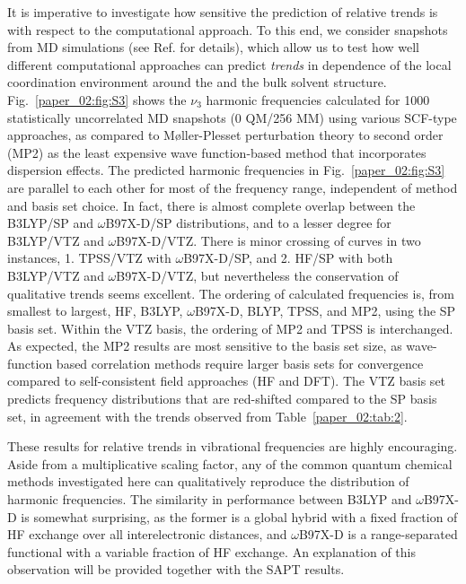 It is imperative to investigate how sensitive the prediction of relative trends is with respect to the computational approach. To this end, we consider snapshots from MD simulations (see Ref. \citep{Daly2016} for details), which allow us to test how well different computational approaches can predict \emph{trends} in dependence of the local coordination environment around the  and the bulk solvent structure. Fig.~\ref{paper_02:fig:S3} shows the  \(\nu_{3}\) harmonic frequencies calculated for \num{1000} statistically uncorrelated MD snapshots (0 QM/256 MM) using various SCF-type approaches, as compared to Møller-Plesset perturbation theory to second order (MP2) as the least expensive wave function-based method that incorporates dispersion effects.\cite{WCMS:WCMS58} The predicted harmonic frequencies in Fig.~\ref{paper_02:fig:S3} are parallel to each other for most of the frequency range, independent of method and basis set choice. In fact, there is almost complete overlap between the B3LYP/SP and \(\omega\)B97X-D/SP distributions, and to a lesser degree for B3LYP/VTZ and \(\omega\)B97X-D/VTZ. There is minor crossing of curves in two instances, 1. TPSS/VTZ with \(\omega\)B97X-D/SP, and 2. HF/SP with both B3LYP/VTZ and \(\omega\)B97X-D/VTZ, but nevertheless the conservation of qualitative trends seems excellent. The ordering of calculated frequencies is, from smallest to largest, HF, B3LYP, \(\omega\)B97X-D, BLYP, TPSS, and MP2, using the SP basis set. Within the VTZ basis, the ordering of MP2 and TPSS is interchanged. As expected, the MP2 results are most sensitive to the basis set size, as wave-function based correlation methods require larger basis sets for convergence compared to self-consistent field approaches (HF and DFT). The VTZ basis set predicts frequency distributions that are red-shifted compared to the SP basis set, in agreement with the trends observed from Table~\ref{paper_02:tab:2}.

These results for relative trends in vibrational frequencies are highly encouraging. Aside from a multiplicative scaling factor, any of the common quantum chemical methods investigated here can qualitatively reproduce the distribution of harmonic frequencies. The similarity in performance between B3LYP and \(\omega\)B97X-D is somewhat surprising, as the former is a global hybrid with a fixed fraction of HF exchange over all interelectronic distances, and \(\omega\)B97X-D is a range-separated functional with a variable fraction of HF exchange. An explanation of this observation will be provided together with the SAPT results.

